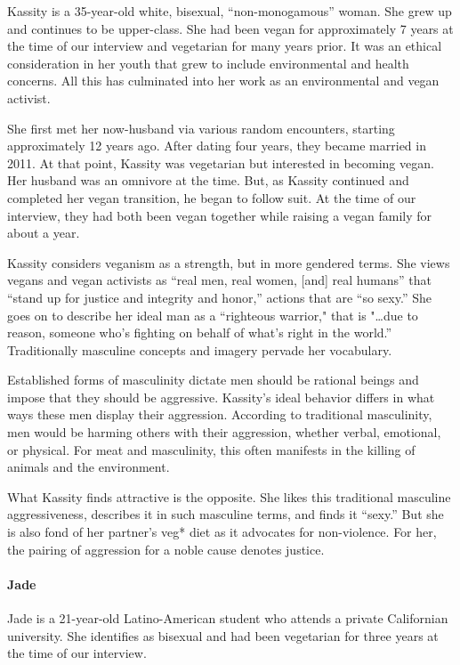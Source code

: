 \documentclass[twoside]{report}
\begin{document}
Kassity is a 35-year-old white, bisexual, ``non-monogamous'' woman. She grew up and continues to be upper-class. She had been vegan for approximately 7 years at the time of our interview and vegetarian for many years prior. It was an ethical consideration in her youth that grew to include environmental and health concerns. All this has culminated
into her work as an environmental and vegan activist.

She first met her now-husband via various random encounters, starting approximately 12 years ago. After dating four years, they became married in 2011. At that point, Kassity was vegetarian but interested in becoming vegan. Her husband was an omnivore at the time. But, as Kassity continued and completed her vegan transition, he began to follow suit. At the time of our interview, they had both been vegan together while raising a vegan family for about a year.

Kassity considers veganism as a strength, but in more gendered terms. She views vegans and vegan activists as ``real men, real women, {[}and{]} real humans'' that ``stand up for justice and integrity and honor,'' actions that are ``so sexy.'' She goes on to describe her ideal man as a ``righteous warrior," that is "\ldots due to reason, someone who's fighting on behalf of what's right in the world.'' Traditionally masculine concepts and imagery pervade her vocabulary.

Established forms of masculinity dictate men should be rational beings and impose that they should be aggressive. Kassity's ideal behavior differs in what ways these men display their aggression. According to traditional masculinity, men would be harming others with their aggression, whether verbal, emotional, or physical. For meat and masculinity, this often manifests in the killing of animals and the environment.

What Kassity finds attractive is the opposite. She likes this traditional masculine aggressiveness, describes it in such masculine terms, and finds it ``sexy.'' But she is also fond of her partner's veg* diet as it advocates for non-violence. For her, the pairing of aggression for a noble cause denotes justice.

\paragraph{Jade}

Jade is a 21-year-old Latino-American student who attends a private Californian university. She identifies as bisexual and had been vegetarian for three years at the time of our interview.
\end{document}
